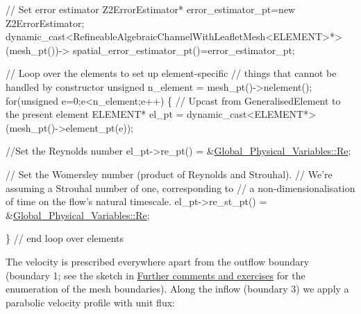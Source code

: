 \begin{DoxyCodeInclude}


 \textcolor{comment}{// Set error estimator}
 Z2ErrorEstimator* error\_estimator\_pt=\textcolor{keyword}{new} Z2ErrorEstimator;
 \textcolor{keyword}{dynamic\_cast<}RefineableAlgebraicChannelWithLeafletMesh<ELEMENT>*\textcolor{keyword}{>}(mesh\_pt())->
  spatial\_error\_estimator\_pt()=error\_estimator\_pt;

 
 \textcolor{comment}{// Loop over the elements to set up element-specific }
 \textcolor{comment}{// things that cannot be handled by constructor}
 \textcolor{keywordtype}{unsigned} n\_element = mesh\_pt()->nelement();
 \textcolor{keywordflow}{for}(\textcolor{keywordtype}{unsigned} e=0;e<n\_element;e++)
  \{
   \textcolor{comment}{// Upcast from GeneralisedElement to the present element}
   ELEMENT* el\_pt = \textcolor{keyword}{dynamic\_cast<}ELEMENT*\textcolor{keyword}{>}(mesh\_pt()->element\_pt(e));
   
   \textcolor{comment}{//Set the Reynolds number}
   el\_pt->re\_pt() = &\hyperlink{namespaceGlobal__Physical__Variables_ab814e627d2eb5bc50318879d19ab16b9}{Global\_Physical\_Variables::Re};
  
   \textcolor{comment}{// Set the Womersley number (product of Reynolds and Strouhal).}
   \textcolor{comment}{// We're assuming a Strouhal number of one, corresponding to}
   \textcolor{comment}{// a non-dimensionalisation of time on the flow's natural timescale.}
   el\_pt->re\_st\_pt() = &\hyperlink{namespaceGlobal__Physical__Variables_ab814e627d2eb5bc50318879d19ab16b9}{Global\_Physical\_Variables::Re};
  
  \} \textcolor{comment}{// end loop over elements}

\end{DoxyCodeInclude}


The velocity is prescribed everywhere apart from the outflow boundary (boundary 1; see the sketch in \hyperlink{index_comm_and_ex}{Further comments and exercises} for the enumeration of the mesh boundaries). Along the inflow (boundary 3) we apply a parabolic velocity profile with unit flux\+:


